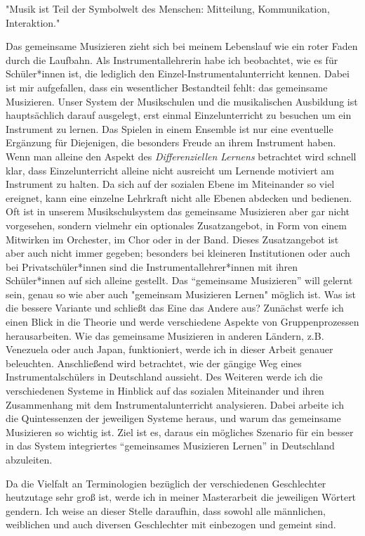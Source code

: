 
"Musik ist Teil der Symbolwelt des Menschen: Mitteilung, Kommunikation,
Interaktion." \autocite[91]{doerne:umfassend_musizieren}

Das gemeinsame Musizieren zieht sich bei meinem Lebenslauf wie ein roter Faden
durch die Laufbahn. Als Instrumentallehrerin habe ich beobachtet, wie es für
Schüler*innen ist, die lediglich den Einzel-Instrumentalunterricht kennen. Dabei
ist mir aufgefallen, dass ein wesentlicher Bestandteil fehlt: das gemeinsame
Musizieren. Unser System der Musikschulen und die musikalischen Ausbildung ist
hauptsächlich darauf ausgelegt, erst einmal Einzelunterricht zu besuchen um
ein Instrument zu lernen. Das Spielen in einem Ensemble ist nur eine eventuelle
Ergänzung für Diejenigen, die besonders Freude an ihrem Instrument haben. Wenn man alleine den Aspekt des
\emph{Differenziellen Lernens}
betrachtet wird schnell klar, dass Einzelunterricht alleine nicht ausreicht um
Lernende motiviert am Instrument zu halten. Da sich auf der sozialen
Ebene im Miteinander so viel ereignet, kann eine einzelne Lehrkraft nicht alle
Ebenen abdecken und bedienen. Oft ist in unserem Musikschulsystem das gemeinsame
Musizieren aber gar nicht vorgesehen, sondern vielmehr ein optionales
Zusatzangebot, in Form von einem Mitwirken im Orchester, im Chor oder in der
Band. Dieses Zusatzangebot ist aber auch nicht immer gegeben; besonders bei
kleineren Institutionen oder auch bei Privatschüler*innen sind die
Instrumentallehrer*innen mit ihren Schüler*innen auf sich alleine gestellt. Das
\enquote{gemeinsame Musizieren} will gelernt sein, genau so wie aber auch
"gemeinsam Musizieren Lernen" möglich ist. Was ist die bessere Variante und
schließt das Eine das Andere aus? Zunächst werfe ich einen Blick in die Theorie
und werde verschiedene Aspekte von Gruppenprozessen herausarbeiten. Wie das
gemeinsame Musizieren in anderen Ländern, z.B. Venezuela oder auch Japan,
funktioniert, werde ich in dieser Arbeit genauer beleuchten. Anschließend wird
betrachtet, wie der gängige Weg eines Instrumentalschülers in Deutschland
aussieht. Des Weiteren werde ich die verschiedenen Systeme in Hinblick auf das
sozialen Miteinander und ihren Zusammenhang mit dem Instrumentalunterricht
analysieren. Dabei arbeite ich die Quintessenzen der jeweiligen Systeme heraus,
und warum das gemeinsame Musizieren so wichtig ist. Ziel ist es, daraus ein
mögliches Szenario für ein besser in das System integriertes 
\enquote{gemeinsames Musizieren Lernen} in Deutschland abzuleiten.


Da die Vielfalt an Terminologien bezüglich der verschiedenen Geschlechter
heutzutage sehr groß ist, werde ich in meiner Masterarbeit die jeweiligen
Wörtert gendern. Ich weise an dieser Stelle daraufhin, dass sowohl alle
männlichen, weiblichen und auch diversen Geschlechter mit einbezogen und gemeint
sind. 

